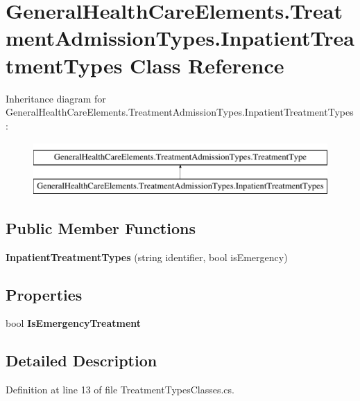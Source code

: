 \hypertarget{class_general_health_care_elements_1_1_treatment_admission_types_1_1_inpatient_treatment_types}{}\section{General\+Health\+Care\+Elements.\+Treatment\+Admission\+Types.\+Inpatient\+Treatment\+Types Class Reference}
\label{class_general_health_care_elements_1_1_treatment_admission_types_1_1_inpatient_treatment_types}
Inheritance diagram for General\+Health\+Care\+Elements.\+Treatment\+Admission\+Types.\+Inpatient\+Treatment\+Types\+:\begin{figure}[H]
\begin{center}
\leavevmode
\includegraphics[height=2.000000cm]{class_general_health_care_elements_1_1_treatment_admission_types_1_1_inpatient_treatment_types}
\end{center}
\end{figure}
\subsection*{Public Member Functions}
\begin{DoxyCompactItemize}
\item 
{\bfseries Inpatient\+Treatment\+Types} (string identifier, bool is\+Emergency)\hypertarget{class_general_health_care_elements_1_1_treatment_admission_types_1_1_inpatient_treatment_types_a4c84cf8162f668bfc4946e51e3acaf11}{}\label{class_general_health_care_elements_1_1_treatment_admission_types_1_1_inpatient_treatment_types_a4c84cf8162f668bfc4946e51e3acaf11}

\end{DoxyCompactItemize}
\subsection*{Properties}
\begin{DoxyCompactItemize}
\item 
bool {\bfseries Is\+Emergency\+Treatment}\hypertarget{class_general_health_care_elements_1_1_treatment_admission_types_1_1_inpatient_treatment_types_ab96f4e086f042808e458ff8d4d704011}{}\label{class_general_health_care_elements_1_1_treatment_admission_types_1_1_inpatient_treatment_types_ab96f4e086f042808e458ff8d4d704011}

\end{DoxyCompactItemize}


\subsection{Detailed Description}


Definition at line 13 of file Treatment\+Types\+Classes.\+cs.


